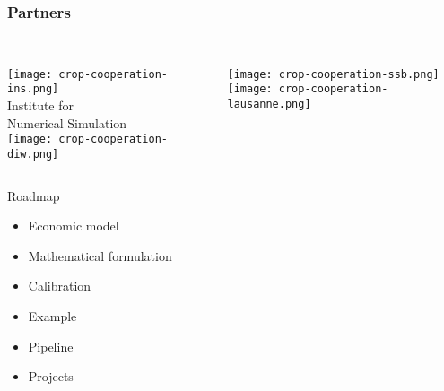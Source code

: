 \begin{frame}\frametitle{Partners}\vspace{1.75cm}

\begin{columns}[t]

\centering \\  \vspace{-1.25cm}
	\texttt{[image: crop-cooperation-ins.png]} \\\vspace{-0.5cm}
	\footnotesize{Institute for \\ Numerical Simulation}\vspace{0.3cm}   \\ \vspace{0.5cm}
	\texttt{[image: crop-cooperation-diw.png]} \\ \vspace{0.5cm}

	\centering \\ \vspace{-0.5cm}
	\texttt{[image: crop-cooperation-ssb.png]} \\ \vspace{0.85cm}
 	\texttt{[image: crop-cooperation-lausanne.png]} \\

\centering \\

\end{columns}

\end{frame}

\begin{frame}{Roadmap}\vspace{0.25cm}

\begin{multicols}{2}

		\begin{itemize}\setlength\itemsep{1em}
			\item Economic model
			\item Mathematical formulation
			\item Calibration
		\end{itemize}

		\pause

		\begin{itemize}\setlength\itemsep{1em}
			\item Example
			\item Pipeline
			\item Projects
		\end{itemize}

	\end{multicols}

\end{frame}
